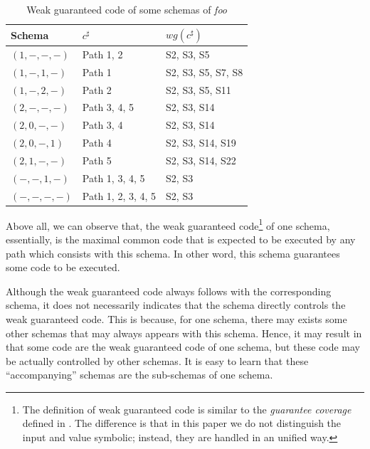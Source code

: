 \documentclass{sig-alternate-05-2015}
\begin{document}
\begin{table}[ht]
\caption{Weak guaranteed code of some schemas of \emph{foo}}
\label{weg-foo}
\center
\begin{tabular}{lll}
 \hline
\bfseries Schema & \bfseries $c^{\sharp}$ & \bfseries $wg(c^{\sharp})$\\  \hline
 $(1, -, -, -)$ & Path 1, 2& S2, S3, S5 \\
 $(1, -, 1, -)$ & Path 1 & S2, S3, S5, S7, S8\\
 $(1, -, 2, -)$ & Path 2 & S2, S3, S5, S11\\
 $(2, -, -, -)$ & Path 3, 4, 5& S2, S3, S14\\
 $(2, 0, -, -)$ & Path 3, 4& S2, S3, S14\\
 $(2, 0, -, 1)$ & Path 4& S2, S3, S14, S19\\
 $(2, 1, -, -)$ & Path 5& S2, S3, S14, S22\\
 $(-, -, 1, -)$ & Path 1, 3, 4, 5 & S2, S3 \\
 $(-, -, -, -)$ & Path 1, 2, 3, 4, 5 & S2, S3 \\
 \hline
\end{tabular}
\end{table}

Above all, we can observe that, the weak guaranteed code\footnote{The definition of weak guaranteed code is similar to the \emph{guarantee coverage} defined in \cite{reisner2010using}. The difference is that in this paper we do not distinguish the input and value symbolic; instead, they are handled in an unified way.} of one schema, essentially, is the maximal common code that is expected to be executed by any path which consists with this schema. In other word, this schema guarantees some code to be executed.





Although the weak guaranteed code always follows with the corresponding schema, it does not necessarily indicates that the schema directly controls the weak guaranteed code. This is because, for one schema, there may exists some other schemas that may always appears with this schema. Hence, it may result in that some code are the weak guaranteed code of one schema, but these code may be actually controlled by other schemas. It is easy to learn that these ``accompanying'' schemas are the sub-schemas of one schema.
\end{document}
